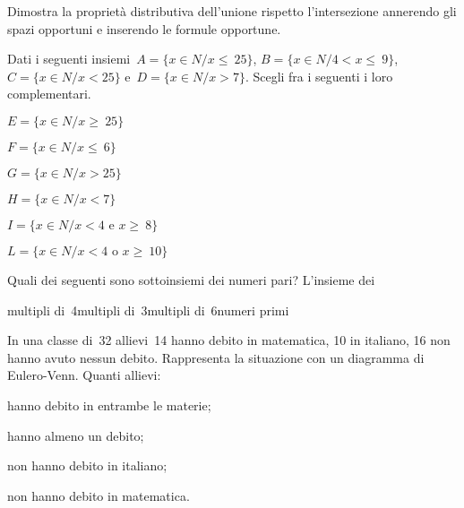 \begin{esercizio}
\label{ese:7.80}
Dimostra la proprietà distributiva dell'unione rispetto l'intersezione annerendo 
gli spazi opportuni
e inserendo le formule opportune.
\begin{center}
 
\end{center}
\vspace{-12pt}
\end{esercizio}

\begin{esercizio}
\label{ese:7.81}
Dati i seguenti insiemi~\(A=\{x\in N/x\le~25\}\), \(B=\{x\in N/4<x\le~9\}\), 
\(C=\{x\in N/x<25\}\) e~\(D=\{x\in N/x>7\}\). 
Scegli fra i seguenti i loro complementari.
\vspace{-6pt}
\begin{multicols}{2}
\begin{enumeratea}
\item \(E=\{x\in N/x\ge~25\}\)
\item \(F=\{x\in N/x\le~6\}\)
\item \(G=\{x\in N/x>25\}\)
\item \(H=\{x\in N/x<7\}\)
\item \(I=\{x\in N/x<4\text{ e }x\ge~8\}\)
\item \(L=\{x\in N/x<4\text{ o }x\ge~10\}\)
\end{enumeratea}
\end{multicols}
\vspace{-12pt}
\end{esercizio}

\begin{esercizio}
\label{ese:7.82}
Quali dei seguenti sono sottoinsiemi dei numeri pari? L'insieme dei
\vspace{-6pt}
\begin{center}
 \boxA\quad multipli di~4\quad\boxB\quad multipli di~3\quad\boxC\quad multipli 
di~6\quad\boxD\quad numeri primi
\end{center}
\vspace{-6pt}
\end{esercizio}

\begin{esercizio}
\label{ese:7.83}
In una classe di~32 allievi~14 hanno debito in matematica, 10 in
italiano, 16 non hanno avuto nessun debito. Rappresenta la situazione
con un diagramma di Eulero-Venn. Quanti allievi:
\vspace{-6pt}
\begin{multicols}{2}
\begin{enumeratea}
\item hanno debito in entrambe le materie;
\item hanno almeno un debito;
\item non hanno debito in italiano;
\item non hanno debito in matematica.
\end{enumeratea}
\end{multicols}
\vspace{-12pt}
\end{esercizio}

